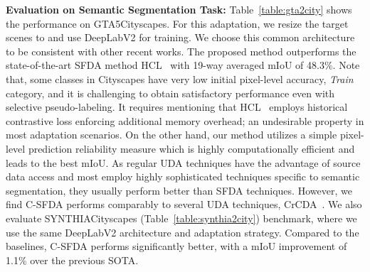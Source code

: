 \documentclass[10pt,twocolumn,letterpaper]{article}
\begin{document}
\vspace{0.7mm}

\noindent \textbf{Evaluation on Semantic Segmentation Task:}
Table~\ref{table:gta2city} shows the performance on  GTA5Cityscapes. For this adaptation, we resize the target scenes to  and use DeepLabV2 for training. We choose this common architecture to be consistent with other recent works. The proposed method outperforms the state-of-the-art SFDA method HCL~\cite{huang2021model} with 19-way averaged mIoU of 48.3\%. Note that, some classes in Cityscapes have very low initial pixel-level accuracy, \eg \emph{Train} category, and it is challenging to obtain satisfactory  performance even with selective pseudo-labeling. It requires mentioning that HCL~\cite{huang2021model} employs historical contrastive loss enforcing additional memory overhead; an undesirable property in most adaptation scenarios. On the other hand, our method utilizes a simple pixel-level prediction reliability measure which is highly computationally efficient and leads to the best mIoU. As regular UDA techniques have the advantage of source data access and most employ highly sophisticated techniques specific to semantic segmentation, they usually perform better than SFDA techniques. However, we find C-SFDA performs comparably to several UDA techniques, \eg CrCDA~\cite{huang2020contextual}. We also evaluate SYNTHIACityscapes (Table~\ref{table:synthia2city}) benchmark, where we use the same DeepLabV2 architecture and adaptation strategy. Compared to the baselines, C-SFDA performs significantly better, with a mIoU improvement of 1.1\% over the previous SOTA. 
\end{document}
